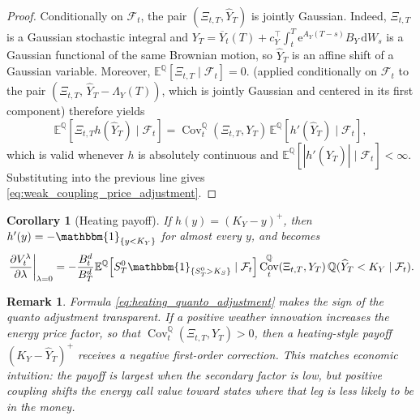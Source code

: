 \documentclass[10pt,a4paper,reqno]{amsart}
\newtheorem{corollary}[theorem]{Corollary}
\newtheorem{remark}[theorem]{Remark}
\newcommand{\E}{\mathbb{E}}
\newcommand{\Q}{\mathbb{Q}}
\newcommand{\F}{\mathcal{F}}
\newcommand{\1}{\mathbbm{1}}
\newcommand{\dd}{\mathrm{d}}
\newcommand{\ee}{\mathrm{e}}
\DeclareMathOperator{\Cov}{Cov}
\begin{document}
\begin{proof}
Conditionally on $\F_t$, the pair $(\Xi_{t,T},\widehat{Y}_T)$ is jointly
Gaussian.
Indeed, $\Xi_{t,T}$ is a Gaussian stochastic integral and $Y_T =
\overline{Y}_t(T) + c_Y^\top\int_t^T \ee^{A_Y(T-s)} B_Y\,\dd W_s$ is a
Gaussian functional of the same Brownian motion, so $\widehat{Y}_T$ is an
affine shift of a Gaussian variable. Moreover,
$\E^\Q[\Xi_{t,T}\mid\F_t]=0$.  (applied conditionally on $\F_t$ to the pair
$(\Xi_{t,T},\,\widehat{Y}_T-\Lambda_Y(T))$, which is jointly Gaussian and
centered in its first component) therefore yields
$$
\E^\Q\!\left[\Xi_{t,T} h(\widehat{Y}_T)\mid\F_t\right]
= \Cov_t^\Q(\Xi_{t,T},Y_T)\,
   \E^\Q\!\left[h'(\widehat{Y}_T)\mid\F_t\right],
$$
which is valid whenever $h$ is absolutely continuous and
$\E^\Q[|h'(\widehat{Y}_T)|\mid\F_t]<\infty$. Substituting into the previous line
gives \eqref{eq:weak_coupling_price_adjustment}.
\end{proof}

\begin{corollary}[Heating payoff]
\label{cor:heating_quanto}
If $h(y)=(K_Y-y)^+$, then $h'(y)=-\1_{\{y<K_Y\}}$ for almost every $y$,
and  becomes
\begin{align}
  \left.\frac{\partial V_t^\lambda}{\partial \lambda}\right|_{\lambda=0}
  = - \frac{B_t^d}{B_T^d}
      \E^\Q\!\left[S_T^0 \1_{\{S_T^0>K_S\}}\mid\F_t\right]
      \Cov_t^\Q(\Xi_{t,T},Y_T)\,
      \Q(\widehat{Y}_T<K_Y\mid\F_t).
      \label{eq:heating_quanto_adjustment}
\end{align}
\end{corollary}

\begin{remark}
Formula \eqref{eq:heating_quanto_adjustment} makes the sign of the quanto
adjustment transparent. If a positive weather innovation increases the energy
price factor, so that $\Cov_t^\Q(\Xi_{t,T},Y_T)>0$, then a heating-style
payoff $(K_Y-\widehat{Y}_T)^+$ receives a negative first-order correction. This matches
economic intuition: the payoff is largest when the secondary factor is low, but
positive coupling shifts the energy call value toward states where that leg is
less likely to be in the money.
\end{remark}
\end{document}
